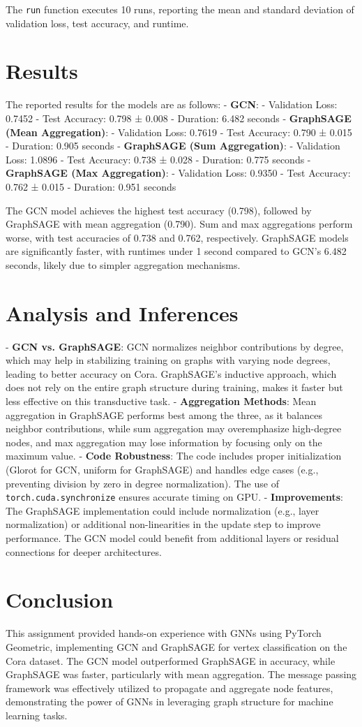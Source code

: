 \documentclass{article}
\begin{document}
The \texttt{run} function executes 10 runs, reporting the mean and standard deviation of validation loss, test accuracy, and runtime.

\section*{Results}
The reported results for the models are as follows:
- \textbf{GCN}:
  - Validation Loss: 0.7452
  - Test Accuracy: 0.798 ± 0.008
  - Duration: 6.482 seconds
- \textbf{GraphSAGE (Mean Aggregation)}:
  - Validation Loss: 0.7619
  - Test Accuracy: 0.790 ± 0.015
  - Duration: 0.905 seconds
- \textbf{GraphSAGE (Sum Aggregation)}:
  - Validation Loss: 1.0896
  - Test Accuracy: 0.738 ± 0.028
  - Duration: 0.775 seconds
- \textbf{GraphSAGE (Max Aggregation)}:
  - Validation Loss: 0.9350
  - Test Accuracy: 0.762 ± 0.015
  - Duration: 0.951 seconds

The GCN model achieves the highest test accuracy (0.798), followed by GraphSAGE with mean aggregation (0.790). Sum and max aggregations perform worse, with test accuracies of 0.738 and 0.762, respectively. GraphSAGE models are significantly faster, with runtimes under 1 second compared to GCN’s 6.482 seconds, likely due to simpler aggregation mechanisms.

\section*{Analysis and Inferences}
- \textbf{GCN vs. GraphSAGE}: GCN normalizes neighbor contributions by degree, which may help in stabilizing training on graphs with varying node degrees, leading to better accuracy on Cora. GraphSAGE’s inductive approach, which does not rely on the entire graph structure during training, makes it faster but less effective on this transductive task.
- \textbf{Aggregation Methods}: Mean aggregation in GraphSAGE performs best among the three, as it balances neighbor contributions, while sum aggregation may overemphasize high-degree nodes, and max aggregation may lose information by focusing only on the maximum value.
- \textbf{Code Robustness}: The code includes proper initialization (Glorot for GCN, uniform for GraphSAGE) and handles edge cases (e.g., preventing division by zero in degree normalization). The use of \texttt{torch.cuda.synchronize} ensures accurate timing on GPU.
- \textbf{Improvements}: The GraphSAGE implementation could include normalization (e.g., layer normalization) or additional non-linearities in the update step to improve performance. The GCN model could benefit from additional layers or residual connections for deeper architectures.

\section*{Conclusion}
This assignment provided hands-on experience with GNNs using PyTorch Geometric, implementing GCN and GraphSAGE for vertex classification on the Cora dataset. The GCN model outperformed GraphSAGE in accuracy, while GraphSAGE was faster, particularly with mean aggregation. The message passing framework was effectively utilized to propagate and aggregate node features, demonstrating the power of GNNs in leveraging graph structure for machine learning tasks.
\end{document}
